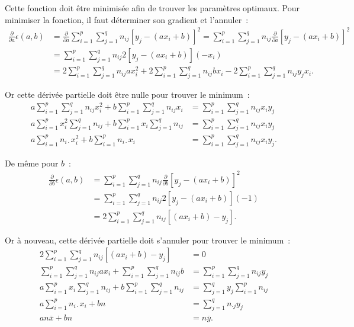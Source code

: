 \documentclass{article}
\renewcommand{\pd}[1]{\frac {\partial}{\partial #1}}
\begin{document}
			Cette fonction doit être minimisée afin de trouver les paramètres optimaux. Pour minimiser la fonction, il faut déterminer son gradient et l'annuler~:
			\begin{align*}
				\pd{a}\epsilon(a, b) &= \pd{a}\sum_{i=1}^p\sum_{j=1}^qn_{ij}\left[y_j - (ax_i + b)\right]^2 = \sum_{i=1}^p\sum_{j=1}^qn_{ij}\pd{a}[y_j-(ax_i+b)]^2 \\
				&= \sum_{i=1}^p\sum_{j=1}^qn_{ij}2[y_j-(ax_i + b)](-x_i) \\
				&= 2\sum_{i=1}^p\sum_{j=1}^qn_{ij}ax_i^2 + 2\sum_{i=1}^p\sum_{j=1}^qn_{ij}bx_i - 2\sum_{i=1}^p\sum_{j=1}^qn_{ij}y_jx_i.
			\end{align*}

			Or cette dérivée partielle doit être nulle pour trouver le minimum~:
			\begin{align*}
				a\sum_{i=1}^p\sum_{j=1}^qn_{ij}x_i^2 + b\sum_{i=1}^p\sum_{j=1}^qn_{ij}x_i &= \sum_{i=1}^p\sum_{j=1}^qn_{ij}x_iy_j \\
				a\sum_{i=1}^px_i^2\sum_{j=1}^qn_{ij} + b\sum_{i=1}^px_i\sum_{j=1}^qn_{ij} &= \sum_{i=1}^p\sum_{j=1}^qn_{ij}x_iy_j \\
				a\sum_{i=1}^pn_{i\cdot}x_i^2 + b\sum_{i=1}^pn_{i\cdot}x_i &= \sum_{i=1}^p\sum_{j=1}^qn_{ij}x_iy_j.
			\end{align*}

			De même pour $b$~:
			\begin{align*}
				\pd b\epsilon(a, b) &= \sum_{i=1}^p\sum_{j=1}^qn_{ij}\pd b[y_j-(ax_i+b)]^2 \\
				&= \sum_{i=1}^p\sum_{j=1}^qn_{ij}2[y_j-(ax_i+b)](-1) \\
				&= 2\sum_{i=1}^p\sum_{j=1}^qn_{ij}[(ax_i+b)-y_j].
			\end{align*}

			Or à nouveau, cette dérivée partielle doit s'annuler pour trouver le minimum~:
			\begin{align*}
				2\sum_{i=1}^p\sum_{j=1}^qn_{ij}[(ax_i+b)-y_j] &= 0 \\
				\sum_{i=1}^p\sum_{j=1}^qn_{ij}ax_i + \sum_{i=1}^p\sum_{j=1}^qn_{ij}b &= \sum_{i=1}^p\sum_{j=1}^qn_{ij}y_j \\
				a\sum_{i=1}^px_i\sum_{j=1}^qn_{ij} + b\sum_{i=1}^p\sum_{j=1}^qn_{ij} &= \sum_{j=1}^qy_j\sum_{i=1}^pn_{ij} \\
				a\sum_{i=1}^pn_{i\cdot}x_i + bn &= \sum_{j=1}^qn_{\cdot j}y_j \\
				an\overline x + bn &= n\overline y.
			\end{align*}
\end{document}
